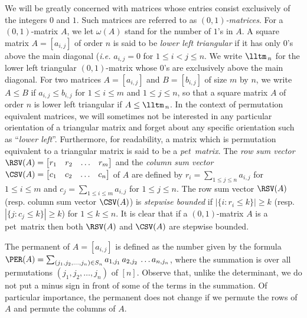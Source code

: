 \documentclass[a4paper,10pt]{llncs}
\newcommand{\PET}{pet}
\begin{document}
We will be greatly concerned with matrices whose entries consist exclusively of
the integers $0$ and $1$.
Such matrices are referred to as \emph{$(0,1)$-matrices}.
For a $(0,1)$-matrix $A$, we let $\omega(A)$ stand for the number of $1$'s in $A$.
A square matrix $A = [a_{i,j}]$ of order $n$ is said to be
\emph{lower left triangular} if it has only $0$'s above the main diagonal
(\emph{i.e.} $a_{i,j} = 0$ for $1 \leq i < j \leq n$.
We write $\lltm_{\,n}$ for the lower left triangular $(0,1)$-matrix 
whose $0$'s are exclusively above the main diagonal.
For two matrices $A = [a_{i,j}]$ and $B = [b_{i,j}]$ of size $m$ by $n$,
we write $A \leq B$ if $a_{i,j} \leq b_{i,j}$ for $1 \leq i \leq m$
and $1 \leq j \leq n$, so that a square matrix $A$ of order $n$ is
lower left triangular if $A \leq \lltm_{\,n}$.
In the context of permutation equivalent matrices,
we will sometimes not be interested in any particular orientation of a
triangular matrix and forget about any
specific orientation such as ``\emph{lower left}''.
Furthermore, for readability, a matrix which is permutation equivalent
to a triangular matrix is said to be a \emph{\PET\ matrix}.
The \emph{row sum vector}
$\RSV(A) = \begin{bmatrix} r_1 & r_2 & \ldots & r_m \end{bmatrix}$
and the  \emph{column sum vector}
$\CSV(A) = \begin{bmatrix} c_1 & c_2 & \ldots & c_n \end{bmatrix}$
of $A$ are defined by
$r_i = \sum_{1 \leq j \leq n} a_{i,j}$ for $1 \leq i \leq m$
and
$c_j = \sum_{1 \leq i \leq m} a_{i,j}$ for $1 \leq j \leq n$.
The row sum vector $\RSV(A)$
(resp. column sum vector $\CSV(A)$)
is \emph{stepwise bounded}
if  $|\{i : r_i \leq k \}| \geq k$
(resp. $|\{j : c_j \leq k \}| \geq k$)
for $1 \leq k \leq n$.
It is clear that if a $(0,1)$-matrix $A$ is a \PET\ matrix then
both $\RSV(A)$ and $\CSV(A)$ are stepwise bounded.

The permanent of $A = [a_{i,j}]$ is defined as the number given by the formula
$\PER(A) = \sum_{(j_1, j_2, \ldots, j_n) \in S_n}
a_{1,j_1}\,a_{2,j_2}\, \ldots a_{n,j_n}$,
where the summation is over all permutations
$(j_1,j_2, \ldots, j_n)$ of $[n]$.
Observe that, unlike the determinant, we do not put a minus sign in front of some of the terms in the
summation.
Of particular importance,
the permanent does not change if we permute the rows of $A$ and
permute the columns of $A$.
\end{document}
